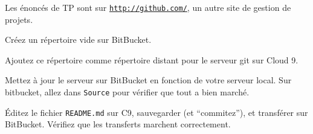 
Les énoncés de TP sont sur \texttt{\url{http://github.com/}}, un autre site
de gestion de projets.


\question Créez un répertoire vide sur BitBucket.

\question Ajoutez ce répertoire comme répertoire distant pour le
serveur git sur Cloud 9.

\question Mettez à jour le serveur sur BitBucket en fonction de votre
serveur local.  Sur bitbucket, allez dans \texttt{Source} pour
vérifier que tout a bien marché.

\question Éditez le fichier \texttt{README.md} sur C9, sauvegarder (et
``commitez''), et transférer sur BitBucket. Vérifiez que les
transferts marchent correctement.
